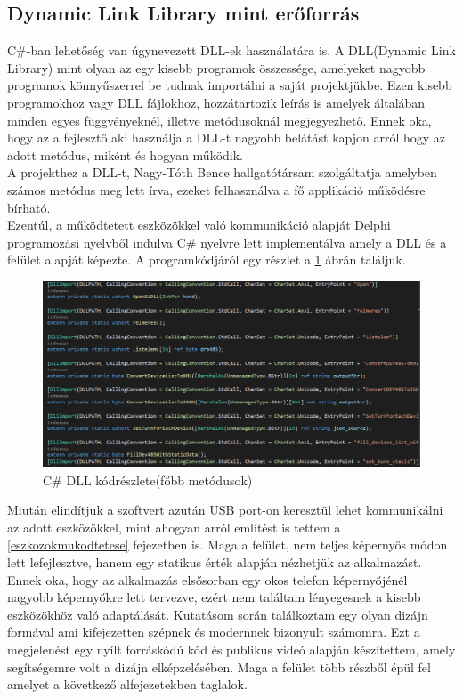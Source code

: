 \documentclass[tocnopagenum]{thesis-ekf}
\theoremstyle{definition}
\theoremstyle{remark}
\begin{document}
	\subsection{Dynamic Link Library mint erőforrás}
	C\#-ban lehetőség van úgynevezett DLL-ek használatára is. A DLL(Dynamic Link Library) mint olyan az egy kisebb programok összessége, amelyeket nagyobb programok könnyűszerrel be tudnak importálni a saját projektjükbe. Ezen kisebb programokhoz vagy DLL fájlokhoz, hozzátartozik leírás is amelyek általában minden egyes függvényeknél, illetve metódusoknál megjegyezhető. Ennek oka, hogy az a fejlesztő aki használja a DLL-t
	nagyobb belátást kapjon arról hogy az adott metódus, miként és hogyan működik.\cite{benlutkevich}
	\\
	A projekthez a DLL-t, Nagy-Tóth Bence hallgatótársam szolgáltatja amelyben számos metódus meg lett írva, ezeket felhasználva a fő applikáció működésre bírható.
	\\
	Ezentúl, a működtetett eszközökkel való kommunikáció alapját Delphi programozási nyelvből indulva C\# nyelvre lett implementálva amely a DLL és a felület alapját képezte. A programkódjáról egy részlet a \ref{fig:dllbence} ábrán találjuk. 
	\begin{figure}[H]	
		\centering
		\includegraphics[scale=0.3]{DLL_bence}
		\caption[C\# DLL kódrészlete]{C\# DLL kódrészlete(főbb metódusok)}
		\label{fig:dllbence}
	\end{figure}
	
	Miután elindítjuk a szoftvert azután USB port-on keresztül lehet kommunikálni az adott eszközökkel, mint ahogyan arról említést is tettem a \ref{eszkozokmukodtetese} fejezetben is.
	Maga a felület, nem teljes képernyős módon lett lefejlesztve, hanem egy statikus érték alapján nézhetjük az alkalmazást.
	Ennek oka, hogy az alkalmazás elsősorban egy okos telefon képernyőjénél nagyobb képernyőkre lett tervezve, ezért nem találtam lényegesnek a kisebb eszközökhöz való adaptálását.
	Kutatásom során találkoztam egy olyan dizájn formával ami kifejezetten szépnek és modernnek bizonyult számomra.\cite{modernUI} 
	Ezt a megjelenést egy nyílt forráskódú kód és publikus videó alapján készítettem, amely segítségemre volt a dizájn elképzelésében.\cite{rjcode}
	Maga a felület több részből épül fel amelyet a következő alfejezetekben taglalok.
	\\
\end{document}
